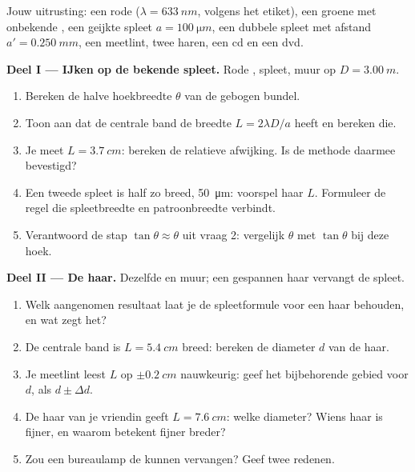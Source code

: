 \begin{problem}
\label{pb:g12:light-as-wave:1}
Jouw uitrusting: een rode  ($\lambda = \qty{633}{nm}$, volgens het
etiket), een groene  met onbekende , een geijkte spleet
$a = \qty{100}{\micro m}$, een dubbele spleet met afstand
$a' = \qty{0.250}{mm}$, een meetlint, twee haren, een cd en een dvd.

\medskip
\noindent\textbf{Deel I --- IJken op de bekende spleet.}
Rode , spleet, muur op $D = \qty{3.00}{m}$.
\begin{enumerate}
  \item Bereken de halve hoekbreedte $\theta$ van de gebogen bundel.
  \item Toon aan dat de centrale band de breedte $L = 2\lambda D/a$ heeft
        en bereken die.
  \item Je meet $L = \qty{3.7}{cm}$: bereken de relatieve afwijking. Is de
        methode daarmee bevestigd?
  \item Een tweede spleet is half zo breed, \qty{50}{\micro m}: voorspel
        haar $L$. Formuleer de regel die spleetbreedte en patroonbreedte
        verbindt.
  \item Verantwoord de stap $\tan\theta \approx \theta$ uit vraag 2:
        vergelijk $\theta$ met $\tan\theta$ bij deze hoek.
\end{enumerate}

\medskip
\noindent\textbf{Deel II --- De haar.} Dezelfde  en muur; een
gespannen haar vervangt de spleet.
\begin{enumerate}[resume]
  \item Welk aangenomen resultaat laat je de spleetformule voor een haar
        behouden, en wat zegt het?
  \item De centrale band is $L = \qty{5.4}{cm}$ breed: bereken de diameter
        $d$ van de haar.
  \item Je meetlint leest $L$ op $\pm\qty{0.2}{cm}$ nauwkeurig: geef het
        bijbehorende gebied voor $d$, als $d \pm \Delta d$.
  \item De haar van je vriendin geeft $L = \qty{7.6}{cm}$: welke diameter?
        Wiens haar is fijner, en waarom betekent fijner breder?
  \item Zou een bureaulamp de  kunnen vervangen? Geef twee redenen.
\end{enumerate}


\end{problem}
